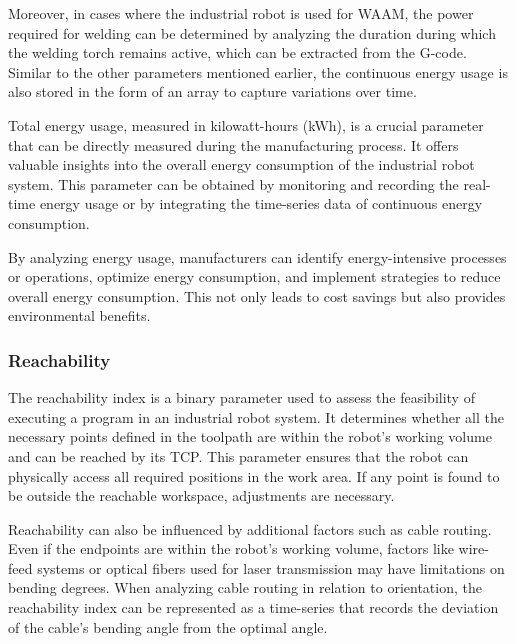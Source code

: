 Moreover, in cases where the industrial robot is used for \acrshort{WAAM}, the power required for welding can be determined by analyzing the duration during which the welding torch remains active, which can be extracted from the G-code. Similar to the other parameters mentioned earlier, the continuous energy usage is also stored in the form of an array to capture variations over time.

Total energy usage, measured in kilowatt-hours (kWh), is a crucial parameter that can be directly measured during the manufacturing process. It offers valuable insights into the overall energy consumption of the industrial robot system. This parameter can be obtained by monitoring and recording the real-time energy usage or by integrating the time-series data of continuous energy consumption.

By analyzing energy usage, manufacturers can identify energy-intensive processes or operations, optimize energy consumption, and implement strategies to reduce overall energy consumption. This not only leads to cost savings but also provides environmental benefits.



\subsubsection*{Reachability}
The reachability index is a binary parameter used to assess the feasibility of executing a program in an industrial robot system. It determines whether all the necessary points defined in the toolpath are within the robot's working volume and can be reached by its TCP. This parameter ensures that the robot can physically access all required positions in the work area. If any point is found to be outside the reachable workspace, adjustments are necessary.

Reachability can also be influenced by additional factors such as cable routing. Even if the endpoints are within the robot's working volume, factors like wire-feed systems or optical fibers used for laser transmission may have limitations on bending degrees. When analyzing cable routing in relation to orientation, the reachability index can be represented as a time-series that records the deviation of the cable's bending angle from the optimal angle.

